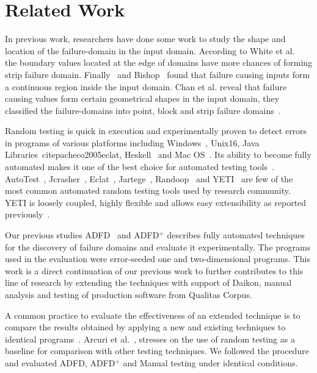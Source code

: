 \section{Related Work}
In previous work, researchers have done some work to study the shape and location of the failure-domain in the input domain. According to White et al.~\cite{white1980domain} the boundary values located at the edge of domains have more chances of forming strip failure domain. Finally~\cite{finelli1991nasa} and Bishop~\cite{bishop1993variation} found that failure causing inputs form a continuous region inside the input domain. Chan et al. reveal that failure causing values form certain geometrical shapes in the input domain, they classified the failure-domains into point, block and strip failure domains~\cite{chan1996proportional}. 

Random testing is quick in execution and experimentally proven to detect errors in programs of various platforms including Windows~\cite{forrester2000empirical}, Unix{16}, Java Libraries~cite{pacheco2005eclat}, Heskell~\cite{claessen2011quickcheck} and Mac OS~\cite{miller2006empirical}.  Its ability to become fully automated makes it one of the best choice for automated testing tools~\cite{csallner2004jcrasher, pacheco2005eclat}. AutoTest~\cite{ciupa2008predictability}, Jcrasher~\cite{csallner2004jcrasher}, Eclat~\cite{pacheco2005eclat}, Jartege~\cite{oriat2005jartege}, Randoop~\cite{pacheco2007randoop} and YETI~\cite{oriol2012random, ahmad2013adfd, ahmad2014adfd2} are few of the most common automated random testing tools used by research community. YETI is loosely coupled, highly flexible and allows easy extensibility as reported previously~\cite{oriol2010testing}. 

Our previous studies ADFD~\cite{ahmad2013adfd} and ADFD$^+$ \cite{ahmad2014adfd2} describes fully automated techniques for the discovery of failure domains and evaluate it experimentally. The programs used in the evaluation were error-seeded one and two-dimensional programs. This work is a direct continuation of our previous work to further contributes to this line of research by extending the techniques with support of Daikon, manual analysis and testing of production software from Qualitas Corpus.

A common practice to evaluate the effectiveness of an extended technique is to compare the results obtained by applying a new and existing techniques to identical programs~\cite{duran1984evaluation, gutjahr1999partition}. Arcuri et al.~\cite{arcuri2012random}, stresses on the use of random testing as a baseline for comparison with other testing techniques. We followed the procedure and evaluated ADFD, ADFD$^+$ and Manual testing under identical conditions.


